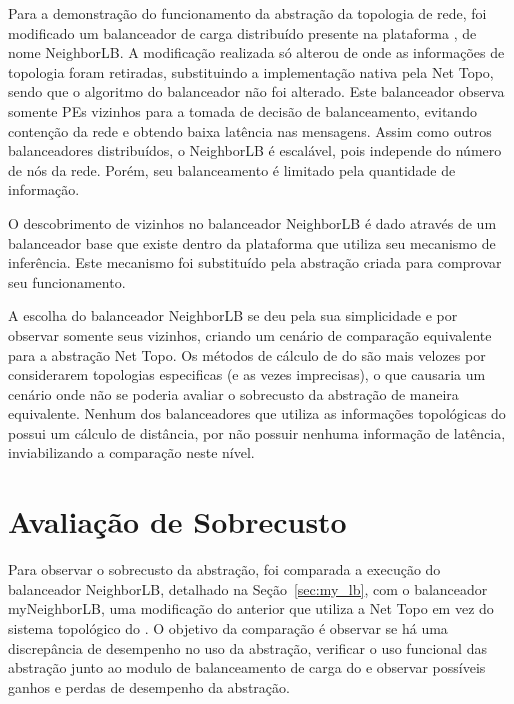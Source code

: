 Para a demonstração do funcionamento da abstração da topologia de rede, foi modificado um balanceador de carga distribuído presente na plataforma \charm, de nome NeighborLB.
A modificação realizada só alterou de onde as informações de topologia foram retiradas, substituindo a implementação nativa pela Net Topo, sendo que o algoritmo do balanceador não foi alterado.
Este balanceador observa somente PEs vizinhos para a tomada de decisão de balanceamento, evitando contenção da rede e obtendo baixa latência nas mensagens.
Assim como outros balanceadores distribuídos, o NeighborLB  é escalável, pois independe do número de nós da rede. Porém, seu balanceamento é limitado pela quantidade de informação.

O descobrimento de vizinhos no balanceador NeighborLB é dado através de um balanceador base que existe dentro da plataforma \charm que utiliza seu mecanismo de inferência.
Este mecanismo foi substituído pela abstração criada para comprovar seu funcionamento.

A escolha do balanceador NeighborLB se deu pela sua simplicidade e por observar somente seus vizinhos, criando um cenário de comparação equivalente para a abstração Net Topo.
Os métodos de cálculo de \hops do \charm são mais velozes por considerarem topologias especificas (e as vezes imprecisas), o que causaria um cenário onde não se poderia avaliar o sobrecusto da abstração de maneira equivalente.
Nenhum dos balanceadores que utiliza as informações topológicas do \charm possui um cálculo de distância, por não possuir nenhuma informação de latência, inviabilizando a comparação neste nível.



\section{Avaliação de Sobrecusto}
\label{sec:overhead}


Para observar o sobrecusto da abstração, foi comparada a execução do balanceador NeighborLB, detalhado na Seção~\ref{sec:my_lb}, com o balanceador myNeighborLB, uma modificação do anterior que utiliza a Net Topo em vez do sistema topológico do \charm.
O objetivo da comparação é observar se há uma discrepância de desempenho no uso da abstração, verificar o uso funcional das abstração junto ao modulo de balanceamento de carga do \charm e observar possíveis ganhos e perdas de desempenho da abstração.

